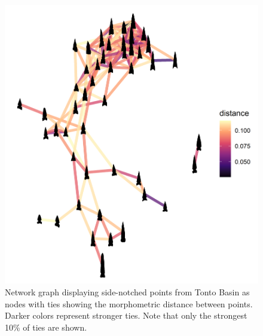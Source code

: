 \documentclass{article}
\begin{document}
\begin{figure}
\includegraphics[width=1\linewidth]{figures/TontoSideDistanceNetwork} \caption{Network graph displaying side-notched points from Tonto Basin as nodes with ties showing the morphometric distance between points. Darker colors represent stronger ties. Note that only the strongest 10\% of ties are shown.}\label{fig:TontoSideDistanceNetwork}
\end{figure}
\end{document}
